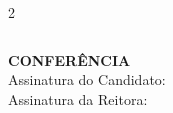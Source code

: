 \documentclass[a4paper,12pt]{article}
\begin{document}
\begin{center}
{\begin{minipage}{1\textwidth}
\begin{multicols}{2}
\begin{center}
\begin{tabular}{|c|c|c|c|c|c|}
        \end{tabular}
        \end{center}
        \end{multicols}
        \end{minipage}
        }
        \end{center}
        \vspace{0.5cm}

        \begin{center}
        \begin{minipage}{0.95\textwidth}
            \centering
            \textbf{CONFERÊNCIA}\\
            \vspace{0.2cm}
            Assinatura do Candidato: \hrulefill \\
            \vspace{0.2cm}
            Assinatura da Reitora: \hrulefill
        \end{minipage}
        \end{center}

        
\end{document}
